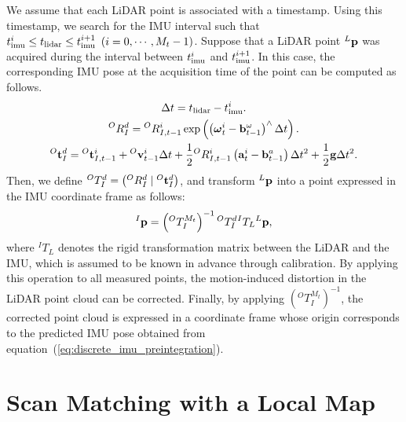 We assume that each LiDAR point is associated with a timestamp.
Using this timestamp, we search for the IMU interval such that $t_{\rm imu}^{i} \leq t_{\rm lidar} \leq t_{\rm imu}^{i+1} ~ \left( i = 0, \cdots, M_{t}-1 \right)$.
Suppose that a LiDAR point ${}^{L}{\bf p}$ was acquired during the interval between $t_{\rm imu}^{i}$ and $t_{\rm imu}^{i+1}$.
In this case, the corresponding IMU pose at the acquisition time of the point can be computed as follows.
%
\begin{align}
  \begin{gathered}
    \Delta t = t_{\rm lidar} - t_{\rm imu}^{i}. \\
%
    {}^{O}R_{I}^{d} = {}^{O}R_{I, t-1}^{i} \exp \left( \left( \boldsymbol \omega_{t}^{i} - {\bf b}_{t-1}^{\omega} 
\right)^{\wedge} \Delta t \right). \\
%
    {}^{O}{\bf t}_{I}^{d} = {}^{O}{\bf t}_{I, t-1}^{i} + {}^{O}{\bf v}_{t-1}^{i} \Delta t + \frac{1}{2} {}^{O}R_{I, t-1}^{i} \left( {\bf a}_{t}^{i} - {\bf b}_{t-1}^{a} \right) \Delta t^{2} + \frac{1}{2} {\bf g} \Delta t^{2}.
  \end{gathered}
\end{align}
%
Then, we define ${}^{O}T_{I}^{d} = \left( {}^{O}R_{I}^{d} \mid {}^{O}{\bf t}_{I}^{d} \right)$, and transform ${}^{L}{\bf p}$ into a point expressed in the IMU coordinate frame as follows:
%
\begin{align}
  {}^{I}{\bf p} = \left( {}^{O}T_{I}^{M_{t}} \right)^{-1} {}^{O}T_{I}^{d} {}^{I}T_{L} {}^{L}{\bf p},
\end{align}
%
where ${}^{I}T_{L}$ denotes the rigid transformation matrix between the LiDAR and the IMU, which is assumed to be known in advance through calibration.
By applying this operation to all measured points, the motion-induced distortion in the LiDAR point cloud can be corrected.
Finally, by applying $\left( {}^{O}T_{I}^{M_{t}} \right)^{-1}$, the corrected point cloud is expressed in a coordinate frame whose origin corresponds to the predicted IMU pose obtained from equation~(\ref{eq:discrete_imu_preintegration}).


















\section{Scan Matching with a Local Map}

